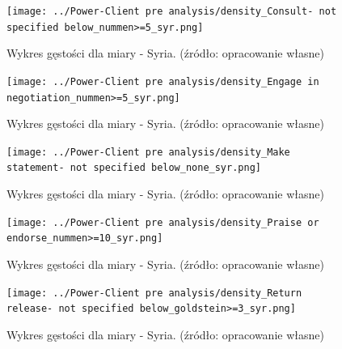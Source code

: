 \documentclass[11pt]{report}
\begin{document}
    \begin{figure}[!htp]
        \centering
        \texttt{[image: ../Power-Client pre analysis/density\_Consult- not specified below\_nummen>=5\_syr.png]}
        \caption{Wykres gęstości dla miary - Syria. (źródło: opracowanie własne)}
        \label{fig:density_Consult- not specified below_nummen>=5_syr}
    \end{figure}
    \begin{figure}[!htp]
        \centering
        \texttt{[image: ../Power-Client pre analysis/density\_Engage in negotiation\_nummen>=5\_syr.png]}
        \caption{Wykres gęstości dla miary - Syria. (źródło: opracowanie własne)}
        \label{fig:density_Engage in negotiation_nummen>=5_syr}
    \end{figure}
    \begin{figure}[!htp]
        \centering
        \texttt{[image: ../Power-Client pre analysis/density\_Make statement- not specified below\_none\_syr.png]}
        \caption{Wykres gęstości dla miary - Syria. (źródło: opracowanie własne)}
        \label{fig:density_Make statement- not specified below_none_syr}
    \end{figure}
    \begin{figure}[!htp]
        \centering
        \texttt{[image: ../Power-Client pre analysis/density\_Praise or endorse\_nummen>=10\_syr.png]}
        \caption{Wykres gęstości dla miary - Syria. (źródło: opracowanie własne)}
        \label{fig:density_Praise or endorse_nummen>=10_syr}
    \end{figure}
    \begin{figure}[!htp]
        \centering
        \texttt{[image: ../Power-Client pre analysis/density\_Return release- not specified below\_goldstein>=3\_syr.png]}
        \caption{Wykres gęstości dla miary - Syria. (źródło: opracowanie własne)}
        \label{fig:density_Return release- not specified below_goldstein>=3_syr}
    \end{figure}
\end{document}
